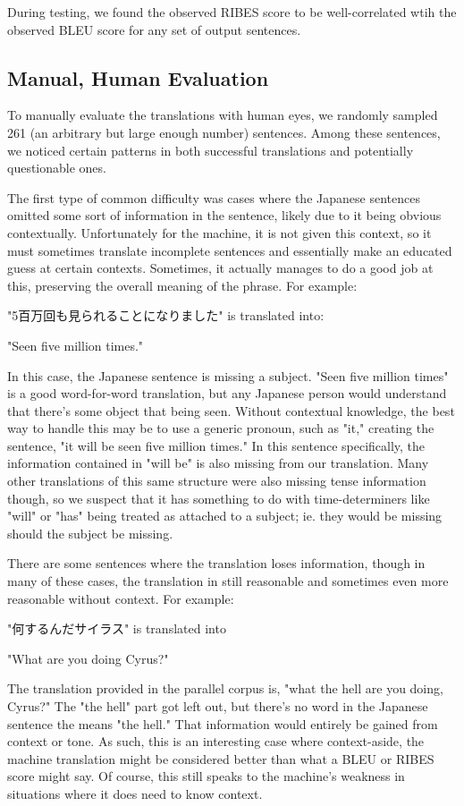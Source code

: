 \documentclass[11pt]{article}
\begin{document}
During testing, we found the observed RIBES score to be well-correlated wtih the observed BLEU score for any set of output sentences.

\subsection{Manual, Human Evaluation}

To manually evaluate the translations with human eyes, we randomly sampled 261 (an arbitrary but large enough number) sentences. Among these sentences, we noticed certain patterns in both successful translations and potentially questionable ones. 

The first type of common difficulty was cases where the Japanese sentences omitted some sort of information in the sentence, likely due to it being obvious contextually. Unfortunately for the machine, it is not given this context, so it must sometimes translate incomplete sentences and essentially make an educated guess at certain contexts. Sometimes, it actually manages to do a good job at this, preserving the overall meaning of the phrase. For example: 

"5百万回も見られることになりました"  is translated into: 

"Seen five million times."

In this case, the Japanese sentence is missing a subject. "Seen five million times" is a good word-for-word translation, but any Japanese person would understand that there's some object that being seen. Without contextual knowledge, the best way to handle this may be to use a generic pronoun, such as "it," creating the sentence, "it will be seen five million times." In this sentence specifically, the information contained in "will be" is also missing from our translation. Many other translations of this same structure were also missing tense information though, so we suspect that it has something to do with time-determiners like "will" or "has" being treated as attached to a subject; ie. they would be missing should the subject be missing.

There are some sentences where the translation loses information, though in many of these cases, the translation in still reasonable and sometimes even more reasonable without context. For example:

"何するんだサイラス" is translated into

"What are you doing Cyrus?"

The translation provided in the parallel corpus is, "what the hell are you doing, Cyrus?" The "the hell" part got left out, but there's no word in the Japanese sentence the means "the hell." That information would entirely be gained from context or tone. As such, this is an interesting case where context-aside, the machine translation might be considered better than what a BLEU or RIBES score might say. Of course, this still speaks to the machine's weakness in situations where it does need to know context.
\end{document}
